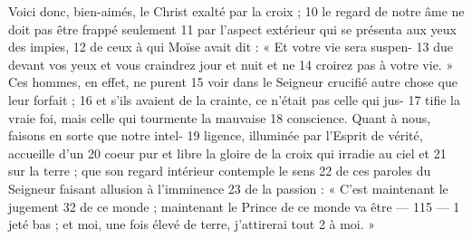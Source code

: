 Voici donc, bien-aimés, le Christ exalté par la croix ;	 
10	 	le regard de notre âme ne doit pas être frappé seulement	 
11	 	par l'aspect extérieur qui se présenta aux yeux des impies,	 
12	 	de ceux à qui Moïse avait dit : « Et votre vie sera suspen-	 
13	 	due devant vos yeux et vous craindrez jour et nuit et ne	 
14	 	croirez pas à votre vie. » Ces hommes, en effet, ne purent	 
15	 	voir dans le Seigneur crucifié autre chose que leur forfait ;	 
16	 	et s'ils avaient de la crainte, ce n'était pas celle qui jus-	 
17	 	tifie la vraie foi, mais celle qui tourmente la mauvaise	 
18	 	conscience. Quant à nous, faisons en sorte que notre intel-	 
19	 	ligence, illuminée par l'Esprit de vérité, accueille d'un	 
20	 	coeur pur et libre la gloire de la croix qui irradie au ciel et	 
21	 	sur la terre ; que son regard intérieur contemple le sens	 
22	 	de ces paroles du Seigneur faisant allusion à l'imminence	 
23	 	de la passion : « C'est maintenant le jugement	 
32	 	de ce monde ; maintenant le Prince de ce monde va être	 
 	--- 115 ---	 
1	 	jeté bas ; et moi, une fois élevé de terre, j'attirerai tout	 
2	 	à moi. »
